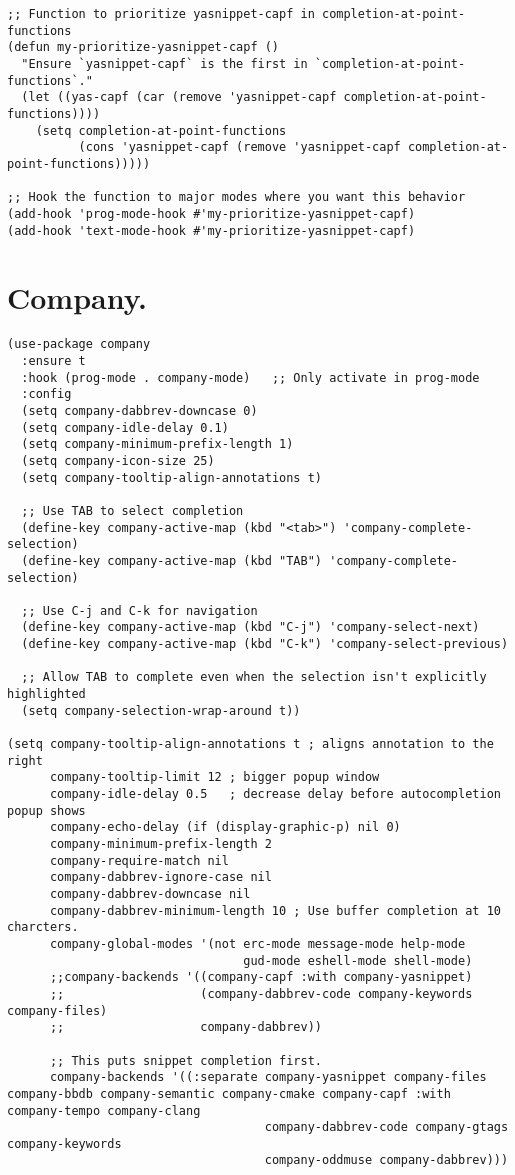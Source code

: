 \documentclass[11pt]{article}
\begin{document}
\begin{verbatim}
;; Function to prioritize yasnippet-capf in completion-at-point-functions
(defun my-prioritize-yasnippet-capf ()
  "Ensure `yasnippet-capf` is the first in `completion-at-point-functions`."
  (let ((yas-capf (car (remove 'yasnippet-capf completion-at-point-functions))))
    (setq completion-at-point-functions
          (cons 'yasnippet-capf (remove 'yasnippet-capf completion-at-point-functions)))))

;; Hook the function to major modes where you want this behavior
(add-hook 'prog-mode-hook #'my-prioritize-yasnippet-capf)
(add-hook 'text-mode-hook #'my-prioritize-yasnippet-capf)
\end{verbatim}
\section{Company.}
\label{sec:orgd8ae2c2}
\begin{verbatim}
(use-package company
  :ensure t
  :hook (prog-mode . company-mode)   ;; Only activate in prog-mode
  :config
  (setq company-dabbrev-downcase 0)
  (setq company-idle-delay 0.1)
  (setq company-minimum-prefix-length 1)
  (setq company-icon-size 25)
  (setq company-tooltip-align-annotations t)

  ;; Use TAB to select completion
  (define-key company-active-map (kbd "<tab>") 'company-complete-selection)
  (define-key company-active-map (kbd "TAB") 'company-complete-selection)

  ;; Use C-j and C-k for navigation
  (define-key company-active-map (kbd "C-j") 'company-select-next)
  (define-key company-active-map (kbd "C-k") 'company-select-previous)

  ;; Allow TAB to complete even when the selection isn't explicitly highlighted
  (setq company-selection-wrap-around t))

(setq company-tooltip-align-annotations t ; aligns annotation to the right
      company-tooltip-limit 12 ; bigger popup window
      company-idle-delay 0.5   ; decrease delay before autocompletion popup shows
      company-echo-delay (if (display-graphic-p) nil 0)
      company-minimum-prefix-length 2
      company-require-match nil
      company-dabbrev-ignore-case nil
      company-dabbrev-downcase nil
      company-dabbrev-minimum-length 10 ; Use buffer completion at 10 charcters.
      company-global-modes '(not erc-mode message-mode help-mode
                                 gud-mode eshell-mode shell-mode)
      ;;company-backends '((company-capf :with company-yasnippet)
      ;;                   (company-dabbrev-code company-keywords company-files)
      ;;                   company-dabbrev))

      ;; This puts snippet completion first.
      company-backends '((:separate company-yasnippet company-files company-bbdb company-semantic company-cmake company-capf :with company-tempo company-clang
                                    company-dabbrev-code company-gtags company-keywords
                                    company-oddmuse company-dabbrev)))
\end{verbatim}
\end{document}
